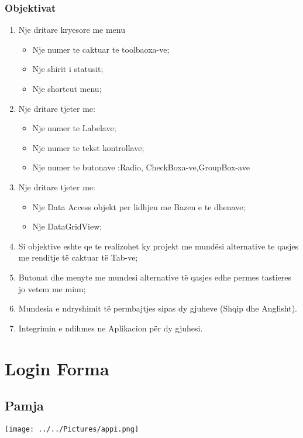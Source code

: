 \documentclass[a4paper]{article}
\begin{document}
\subsubsection{Objektivat}
\begin{enumerate}
\item Nje dritare kryesore me menu
\begin{itemize}
\item Nje numer te caktuar te toolbaoxa-ve;
\item Nje shirit i statusit;
\item Nje shortcut menu;
\end{itemize}
\item Nje dritare tjeter me:
\begin{itemize}
\item Nje numer te Labelave;
\item Nje numer te tekst kontrollave;
\item  Nje numer te butonave :Radio, CheckBoxa-ve,GroupBox-ave
\end{itemize}
\item Nje dritare tjeter  me:
\begin{itemize}
\item Nje Data Access objekt per lidhjen me Bazen e te dhenave;
\item Nje DataGridView;
\end{itemize}
\item Si objektive eshte qe te realizohet ky projekt me mundësi alternative te qasjes me
renditje të caktuar të Tab-ve;
\item  Butonat dhe menyte me mundesi alternative të qasjes edhe permes tastieres jo
vetem me miun;
\item  Mundesia e ndryshimit të permbajtjes sipas dy gjuheve (Shqip dhe Anglisht).
\item Integrimin e ndihmes ne Aplikacion për dy gjuhesi.
\end{enumerate}
\newpage
\section{Login Forma}
\subsection{Pamja}
\begin{center}
\texttt{[image: ../../Pictures/appi.png]} 
\end{center}
\end{document}
